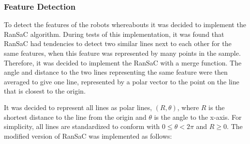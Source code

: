 \subsubsection{Feature Detection}
To detect the features of the robots whereabouts it was decided to implement the RanSaC algorithm.
During tests of this implementation, it was found that RanSaC
had tendencies to detect two similar lines next to each other for the same features,
when this feature was represented by many points in the sample.
Therefore, it was decided to implement the RanSaC with a merge function.
The angle and distance to the two lines representing the same feature were then averaged to give one line,
represented by a polar vector to the point on the line that is closest to the origin.



It was decided to represent all lines as polar lines, $ (R, \theta) $,
where $R$ is the shortest distance to the line from the origin and $\theta$ is the angle to the x-axis.
For simplicity, all lines are standardized to conform with $ 0 \leq \theta < 2\pi $ and $ R \geq 0 $.
The modified version of RanSaC was implemented as follows:

